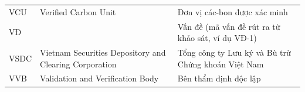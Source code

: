 \documentclass[a4paper,oneside]{report}
\begin{document}
\begin{longtable}{@{}p{2.4cm}p{5.4cm}p{6.3cm}@{}}
VCU    & Verified Carbon Unit                      & Đơn vị các-bon được xác minh \\
VĐ     &                                           & Vấn đề (mã vấn đề rút ra từ khảo sát, ví dụ VĐ-1) \\
VSDC   & Vietnam Securities Depository and Clearing Corporation & Tổng công ty Lưu ký và Bù trừ Chứng khoán Việt Nam \\
VVB    & Validation and Verification Body          & Bên thẩm định độc lập \\
\end{longtable}

\clearpage
{}



% 

% 

% 

% 
\end{document}
